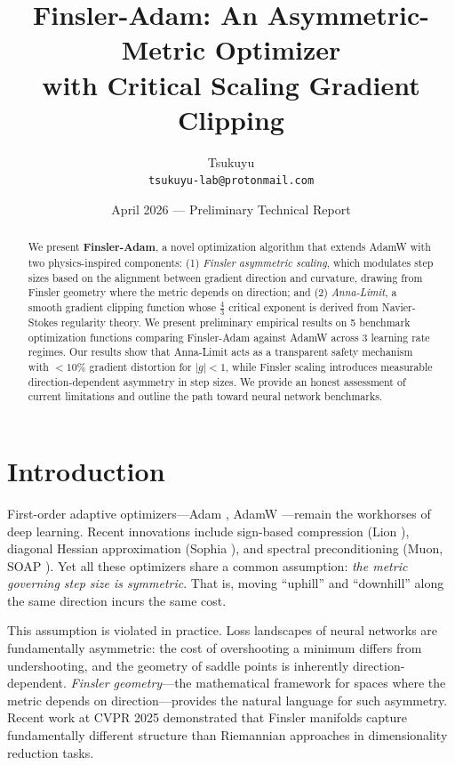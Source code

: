 \documentclass[11pt,a4paper,twocolumn]{article}
\title{\textbf{Finsler-Adam: An Asymmetric-Metric Optimizer\\with Critical Scaling Gradient Clipping}}
\author{
  Tsukuyu\\
  \texttt{tsukuyu-lab@protonmail.com}
}
\date{April 2026 --- Preliminary Technical Report}
\begin{document}
\maketitle

\begin{abstract}
We present \textbf{Finsler-Adam}, a novel optimization algorithm that extends AdamW with two physics-inspired components: (1) \emph{Finsler asymmetric scaling}, which modulates step sizes based on the alignment between gradient direction and curvature, drawing from Finsler geometry where the metric depends on direction; and (2) \emph{Anna-Limit}, a smooth gradient clipping function whose $\frac{4}{3}$ critical exponent is derived from Navier-Stokes regularity theory. We present preliminary empirical results on 5 benchmark optimization functions comparing Finsler-Adam against AdamW across 3 learning rate regimes. Our results show that Anna-Limit acts as a transparent safety mechanism with $<10\%$ gradient distortion for $|g| < 1$, while Finsler scaling introduces measurable direction-dependent asymmetry in step sizes. We provide an honest assessment of current limitations and outline the path toward neural network benchmarks.
\end{abstract}

\section{Introduction}

First-order adaptive optimizers---Adam \cite{kingma2014adam}, AdamW \cite{loshchilov2019decoupled}---remain the workhorses of deep learning. Recent innovations include sign-based compression (Lion \cite{chen2023lion}), diagonal Hessian approximation (Sophia \cite{liu2023sophia}), and spectral preconditioning (Muon, SOAP \cite{muon2025}). Yet all these optimizers share a common assumption: \emph{the metric governing step size is symmetric}. That is, moving ``uphill'' and ``downhill'' along the same direction incurs the same cost.

This assumption is violated in practice. Loss landscapes of neural networks are fundamentally asymmetric: the cost of overshooting a minimum differs from undershooting, and the geometry of saddle points is inherently direction-dependent. \emph{Finsler geometry}---the mathematical framework for spaces where the metric depends on direction---provides the natural language for such asymmetry. Recent work at CVPR 2025 \cite{dages2025finsler} demonstrated that Finsler manifolds capture fundamentally different structure than Riemannian approaches in dimensionality reduction tasks.
\end{document}
